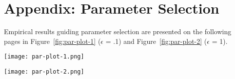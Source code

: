 
\section{Appendix: Parameter Selection}
\label{Sec:AppOptPars}

Empirical results guiding parameter selection are presented on the following
pages in Figure~\ref{fig:par-plot-1} ($\epsilon$ = .1) and Figure~\ref{fig:par-plot-2} 
($\epsilon$ = 1). 

\begin{figure*}[h]
\centering
\texttt{[image: par-plot-1.png]}
\caption{Power comparison in settings where $\epsilon = .1$. Within each subplot,
each color curve corresponds to a different value of $q$ (blue: 0.75, gold: 1,
green: 1.5, red: 2). The two main columns
of plots correspond to different values of $k$ and the three main rows correspond
to difference values of $\rho$. Note that the scale on the x-axis differs with $k$
($k = 7$ requires more data).}\label{fig:par-plot-1}
\end{figure*}

\begin{figure*}[h]
\centering
\texttt{[image: par-plot-2.png]}
\caption{Power comparison in settings where $\epsilon = 1$. Within each subplot,
each color curve corresponds to a different value of $q$ (blue: 0.75, gold: 1,
green: 1.5, red: 2). The two main columns
of plots correspond to different values of $k$ and the three main rows correspond
to difference values of $\rho$. Note that the scale on the x-axis differs with $k$
($k = 7$ requires more data).}\label{fig:par-plot-2}
\end{figure*}
